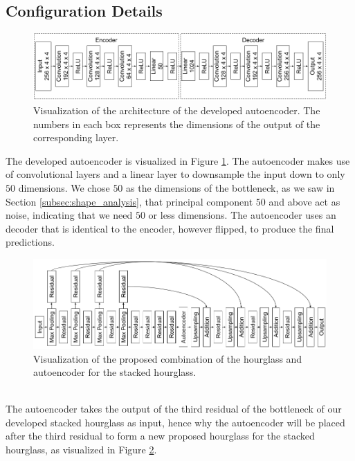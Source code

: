 \documentclass[./main.tex]{subfiles}
\begin{document}
\subsection{Configuration Details}\label{subsec:improv_conf_details}
\begin{figure}[htbp]
    \centering
    \includegraphics[width = \textwidth]{entities/Ae_model.png}
    \caption{Visualization of the architecture of the developed autoencoder. The numbers in each box represents the dimensions of the output of the corresponding layer.}
    \label{fig:AE_model}
\end{figure}
\noindent The developed autoencoder is visualized in Figure \ref{fig:AE_model}. The autoencoder makes use of convolutional layers and a linear layer to downsample the input down to only $50$ dimensions. We chose $50$ as the dimensions of the bottleneck, as we saw in Section \ref{subsec:shape_analysis}, that principal component $50$ and above act as noise, indicating that we need $50$ or less dimensions. The autoencoder uses an decoder that is identical to the encoder, however flipped, to produce the final predictions.
\\
\begin{figure}[htbp]
    \centering
    \includegraphics[width = \textwidth]{entities/SHG_AE.png}
    \caption{Visualization of the proposed combination of the hourglass and autoencoder for the stacked hourglass.}
    \label{fig:SHG_AE}
\end{figure}
\\
The autoencoder takes the output of the third residual of the bottleneck of our developed stacked hourglass as input, hence why the autoencoder will be placed after the third residual to form a new proposed hourglass for the stacked hourglass, as visualized in Figure \ref{fig:SHG_AE}.
\end{document}
